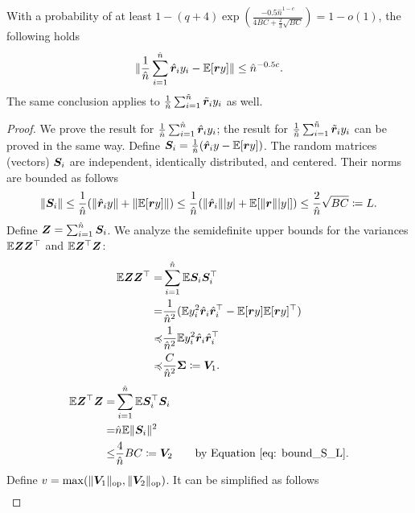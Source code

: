 \begin{lemma}\label{lemma: bernstein_ry}
With a probability of at least $1-(q+4) \exp( \frac{-0.5\hat{n}^{1-c}}{4BC+\frac{2}{3} \sqrt{BC}} )=1-o(1) $, the following holds
\begin{align}
    \nonumber
    \| \frac{1}{\hat{n}}\sum_{i=1}^{\hat{n}} \hat{{\bm{r}}}_iy_i  -\mathbb{E}[ {\bm{r}} y ] \| \leq \hat{n}^{-0.5c}.
\end{align}
The same conclusion applies to $\frac{1}{\tilde{n}} \sum_{i=1}^{\tilde{n}}\tilde{{\bm{r}}}_iy_i$ as well.
\end{lemma}
\begin{proof}
We prove the result for $ \frac{1}{\hat{n}} \sum_{i=1}^{\hat{n}}\hat{{\bm{r}}}_iy_i $; the result for $ \frac{1}{\tilde{n}} \sum_{i=1}^{\tilde{n}}\tilde{{\bm{r}}}_iy_i $ can be proved in the same way. Define ${\bm{S}}_i = \frac{1}{\hat{n}}(\hat{{\bm{r}}}_iy -\mathbb{E}[{\bm{r}} y])$. The random matrices (vectors) ${\bm{S}}_i$ are independent, identically distributed, and centered. Their norms are bounded as follows
\begin{align}
\label{eq: bound_S_L}
    \|{\bm{S}}_i\| \leq \frac{1}{\hat{n}}(\|\hat{{\bm{r}}}_i y\| + \| \mathbb{E}[{\bm{r}} y] \|  ) \leq \frac{1}{\hat{n}}(\|\hat{{\bm{r}}}_i\| |y| +  \mathbb{E}[\|{\bm{r}}\|  |y|]   ) \leq \frac{2}{\hat{n}}\sqrt{BC} \coloneqq L.
\end{align}
Define ${\bm{Z}} = \sum_{i=1}^{\hat{n}} {\bm{S}}_i $. We analyze the semidefinite upper bounds for the variances $ \mathbb{E} {\bm{Z}}{\bm{Z}}^\top$ and $ \mathbb{E} {\bm{Z}}^\top{\bm{Z}}$:
\begin{align}
    \nonumber
    \mathbb{E} {\bm{Z}}{\bm{Z}}^\top = & \sum_{i=1}^{\hat{n}} \mathbb{E} {\bm{S}}_i{\bm{S}}_i^\top \\
    \nonumber
    = & \frac{1}{\hat{n}^2}( \mathbb{E} y_i^2\hat{{\bm{r}}}_i\hat{{\bm{r}}}_i^\top - \mathbb{E} [{\bm{r}} y]\mathbb{E} [{\bm{r}} y]^\top ) \\
    \nonumber
    \preccurlyeq &  \frac{1}{\hat{n}^2} \mathbb{E} y_i^2\hat{{\bm{r}}}_i\hat{{\bm{r}}}_i^\top \\
    \nonumber
    \preccurlyeq & \frac{C}{\hat{n}^2} {\bm{\Sigma}} \coloneqq {\bm{V}}_1.
\end{align}
\begin{align}
    \nonumber
    \mathbb{E} {\bm{Z}}^\top {\bm{Z}} = & \sum_{i=1}^{\hat{n}} \mathbb{E} {\bm{S}}_i^\top{\bm{S}}_i \\
    \nonumber
    = & \hat{n} \mathbb{E} \|{\bm{S}}_i\|^2 \\
    \nonumber
    \leq & \frac{4}{\hat{n}} BC \coloneqq {\bm{V}}_2 \quad\quad\text{by Equation \ref{eq: bound_S_L}}.
\end{align}
Define $ v = \max( \lVert {\bm{V}}_1 \rVert_{\mathrm{op}}, \lVert {\bm{V}}_2 \rVert_{\mathrm{op}} )$. It can be simplified as follows
\begin{align}

\end{align}
\end{proof}
